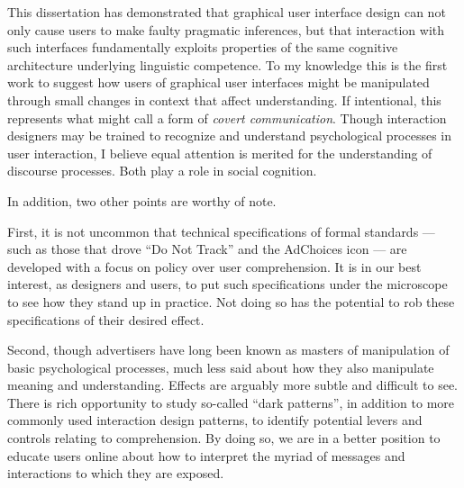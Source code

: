 This dissertation has demonstrated that graphical user interface design can not only cause users to make faulty pragmatic inferences, but that interaction with such interfaces fundamentally exploits properties of the same cognitive architecture underlying linguistic competence. To my knowledge this is the first work to suggest how users of graphical user interfaces might be manipulated through small changes in context that affect understanding. If intentional, this represents what  \cite{Sperber:1986uk}  might call a form of \emph{covert communication}. Though interaction designers may be trained to recognize and understand psychological processes in user interaction, I believe equal attention is merited for the understanding of discourse processes. Both play a role in social cognition.

In addition, two other points are worthy of note.

First, it is not uncommon that technical specifications of formal standards --- such as those that drove ``Do Not Track'' and the AdChoices icon --- are developed with a focus on policy over user comprehension. It is in our best interest, as designers and users, to put such specifications under the microscope to see how they stand up in practice. Not doing so has the potential to rob these specifications of their desired effect.

Second, though advertisers have long been known as masters of manipulation of basic psychological processes, much less said about how they also manipulate meaning and understanding. Effects are arguably more subtle and difficult to see. There is rich opportunity to study so-called ``dark patterns'', in addition to more commonly used interaction design patterns, to identify potential levers and controls relating to comprehension. By doing so, we are in a better position to educate users online about how to interpret the myriad of messages and interactions to which they are exposed.
